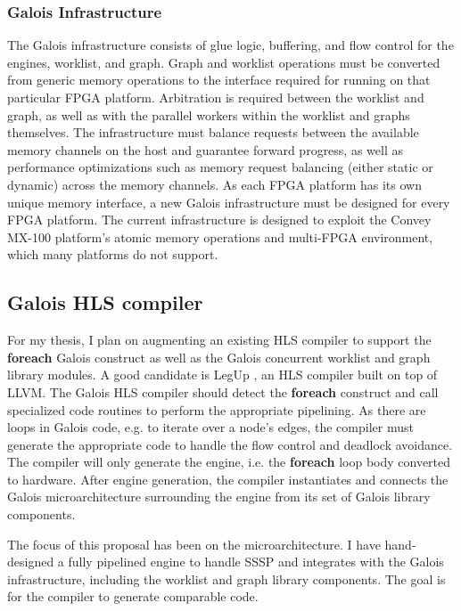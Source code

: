 \subsubsection{Galois Infrastructure}

The Galois infrastructure consists of glue logic, buffering, and flow control for the engines, worklist, and graph. 
Graph and worklist operations must be converted from generic memory operations to the interface required for running 
on that particular FPGA platform. Arbitration is required between the worklist and graph, as well as with the parallel 
workers within the worklist and graphs themselves. The infrastructure must balance requests between the available 
memory channels on the host and guarantee forward progress, as well as performance optimizations such as memory 
request balancing (either static or dynamic) across the memory channels. As each FPGA platform has its own unique 
memory interface, a new Galois infrastructure must be designed for every FPGA platform. The current infrastructure is 
designed to exploit the Convey MX-100 platform's atomic memory operations and multi-FPGA environment, 
which many platforms do not support.



\subsection{Galois HLS compiler}

For my thesis, I plan on augmenting an existing HLS compiler to support the \textbf{foreach} Galois construct as well 
as the Galois concurrent worklist and graph library modules. A good candidate is LegUp \cite{legupMT}, an HLS compiler 
built on top of LLVM. The Galois HLS compiler should detect the \textbf{foreach} construct and call specialized code 
routines to perform the appropriate pipelining. As there are loops in Galois code, e.g. to iterate over a 
node's edges, the compiler must generate the appropriate code to handle the flow control and deadlock 
avoidance. The compiler will only generate the engine, i.e. the \textbf{foreach} loop body converted to hardware. After engine 
generation, the compiler instantiates and connects the Galois microarchitecture surrounding the engine from its set of 
Galois library components.

The focus of this proposal has been on the microarchitecture. I have hand-designed a fully pipelined engine to handle 
SSSP and integrates with the Galois infrastructure, including the worklist and graph library components. The goal is 
for the compiler to generate comparable code.